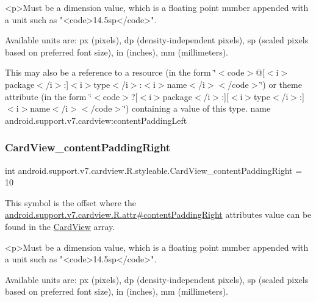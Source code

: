\begin{DoxyVerb}      <p>Must be a dimension value, which is a floating point number appended with a unit such as "<code>14.5sp</code>".
\end{DoxyVerb}
 Available units are\+: px (pixels), dp (density-\/independent pixels), sp (scaled pixels based on preferred font size), in (inches), mm (millimeters). 

This may also be a reference to a resource (in the form \char`\"{}$<$code$>$@\mbox{[}$<$i$>$package$<$/i$>$\+:\mbox{]}$<$i$>$type$<$/i$>$\+:$<$i$>$name$<$/i$>$$<$/code$>$\char`\"{}) or theme attribute (in the form \char`\"{}$<$code$>$?\mbox{[}$<$i$>$package$<$/i$>$\+:\mbox{]}\mbox{[}$<$i$>$type$<$/i$>$\+:\mbox{]}$<$i$>$name$<$/i$>$$<$/code$>$\char`\"{}) containing a value of this type.  name android.\+support.\+v7.\+cardview\+:content\+Padding\+Left \mbox{\label{classandroid_1_1support_1_1v7_1_1cardview_1_1R_1_1styleable_a628bf5a056adce073b9e664d4a2f4d14}} 
\subsubsection{\texorpdfstring{Card\+View\+\_\+content\+Padding\+Right}{CardView\_contentPaddingRight}}
{\footnotesize\ttfamily int android.\+support.\+v7.\+cardview.\+R.\+styleable.\+Card\+View\+\_\+content\+Padding\+Right = 10\hspace{0.3cm}{\ttfamily [static]}}

This symbol is the offset where the \hyperlink{classandroid_1_1support_1_1v7_1_1cardview_1_1R_1_1attr_a0853e7e5200f341f20030708dafe98c5}{android.\+support.\+v7.\+cardview.\+R.\+attr\#content\+Padding\+Right} attribute\textquotesingle{}s value can be found in the \hyperlink{classandroid_1_1support_1_1v7_1_1cardview_1_1R_1_1styleable_ad08b98a07471f174f404c58941fc82ca}{Card\+View} array.

\begin{DoxyVerb}      <p>Must be a dimension value, which is a floating point number appended with a unit such as "<code>14.5sp</code>".
\end{DoxyVerb}
 Available units are\+: px (pixels), dp (density-\/independent pixels), sp (scaled pixels based on preferred font size), in (inches), mm (millimeters). 

